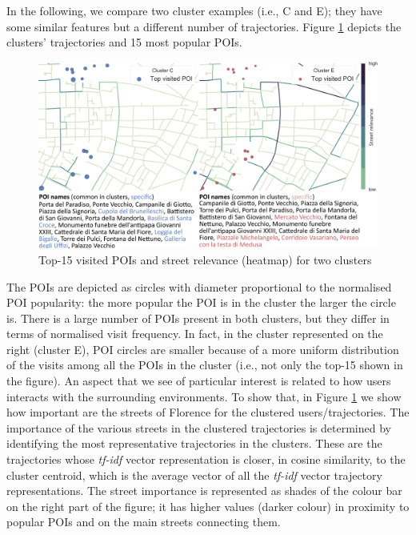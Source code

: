 In the following, we compare two cluster examples (i.e., C and E); they have some similar features but a different number of trajectories. Figure \ref{fig:cluster_map} depicts the clusters' trajectories and 15 most popular POIs.

\begin{figure}
	\centering
	\includegraphics[width=\linewidth]{cluster_comparison_poinames}
	\caption{Top-15 visited POIs and street relevance (heatmap) for two clusters}
	\label{fig:cluster_map}
\end{figure}

The POIs are depicted as circles with diameter proportional to the normalised POI popularity:  the more popular the POI is in the cluster the larger the circle is. There is a large number of POIs present in both clusters, but they differ in terms of normalised visit frequency. In fact, in the cluster represented on the right (cluster E), POI circles are smaller because of a more uniform distribution of the visits among all the POIs in the cluster (i.e., not only the top-15 shown in the figure). 
An aspect that we see of particular interest is related to how users interacts with the surrounding environments. To show that, in Figure \ref{fig:cluster_map} we show how important are the streets of Florence for the clustered users/trajectories.
The importance of the various streets in the clustered trajectories is determined by identifying the most representative trajectories in the clusters. These are the trajectories whose \textit{tf-idf} vector representation is closer, in cosine similarity, to the cluster centroid, which is the average vector of all the \textit{tf-idf} vector trajectory representations. The street importance is represented as shades of the colour bar on the right part of the figure; it has higher values (darker colour) in proximity to popular POIs and on the main streets connecting them. 

